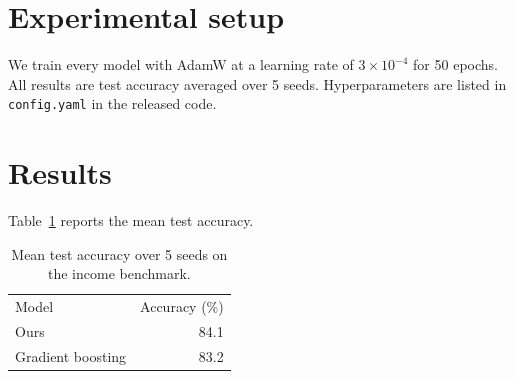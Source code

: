 \documentclass{article}
\begin{document}
\begin{abstract}
On the income benchmark our tabular model reaches 84.3\% test accuracy, ahead of the gradient-boosting baseline.
\end{abstract}
\section{Experimental setup}
We train every model with AdamW at a learning rate of $3\times10^{-4}$ for 50 epochs.
All results are test accuracy averaged over 5 seeds.
Hyperparameters are listed in \texttt{config.yaml} in the released code.
\section{Results}
Table~\ref{tab:main} reports the mean test accuracy.
\begin{table}[h]
\centering
\begin{tabular}{lr}
Model & Accuracy (\%) \\
Ours & 84.1 \\
Gradient boosting & 83.2 \\
\end{tabular}
\caption{Mean test accuracy over 5 seeds on the income benchmark.}
\label{tab:main}
\end{table}
\end{document}
